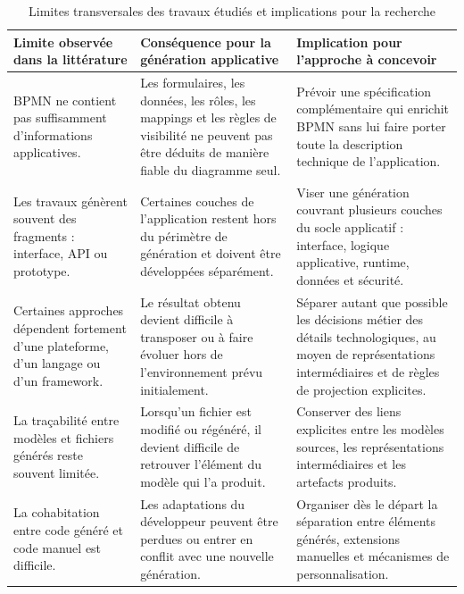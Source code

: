 \begin{table}[H]
\centering
\caption{Limites transversales des travaux étudiés et implications pour la recherche}
\label{tab:chap2-synthese-critique}
\renewcommand{\arraystretch}{1.15}
\begin{tabularx}{\textwidth}{p{3.7cm}p{4.4cm}X}
\toprule
\textbf{Limite observée dans la littérature}
& \textbf{Conséquence pour la génération applicative}
& \textbf{Implication pour l'approche à concevoir} \\
\midrule

BPMN ne contient pas suffisamment d'informations applicatives.
& Les formulaires, les données, les rôles, les mappings et les règles de visibilité ne peuvent pas être déduits de manière fiable du diagramme seul.
& Prévoir une spécification complémentaire qui enrichit BPMN sans lui faire porter toute la description technique de l'application. \\

Les travaux génèrent souvent des fragments : interface, API ou prototype.
& Certaines couches de l'application restent hors du périmètre de génération et doivent être développées séparément.
& Viser une génération couvrant plusieurs couches du socle applicatif : interface, logique applicative, runtime, données et sécurité. \\

Certaines approches dépendent fortement d'une plateforme, d'un langage ou d'un framework.
& Le résultat obtenu devient difficile à transposer ou à faire évoluer hors de l'environnement prévu initialement.
& Séparer autant que possible les décisions métier des détails technologiques, au moyen de représentations intermédiaires et de règles de projection explicites. \\

La traçabilité entre modèles et fichiers générés reste souvent limitée.
& Lorsqu'un fichier est modifié ou régénéré, il devient difficile de retrouver l'élément du modèle qui l'a produit.
& Conserver des liens explicites entre les modèles sources, les représentations intermédiaires et les artefacts produits. \\

La cohabitation entre code généré et code manuel est difficile.
& Les adaptations du développeur peuvent être perdues ou entrer en conflit avec une nouvelle génération.
& Organiser dès le départ la séparation entre éléments générés, extensions manuelles et mécanismes de personnalisation. \\


\end{tabularx}
\end{table}
